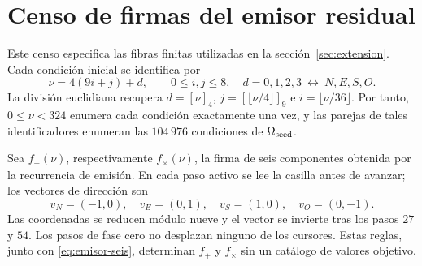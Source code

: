 \section{Censo de firmas del emisor residual}
\label{app:firmas-emision}

Este censo especifica las fibras finitas utilizadas en la sección~\ref{sec:extension}.
Cada condición inicial se identifica por
\[
 \nu=4(9i+j)+d,\qquad 0\leq i,j\leq8,\quad
 d=0,1,2,3\ \longleftrightarrow\ N,E,S,O.
\]
La división euclidiana recupera \(d=[\nu]_4\), \(j=[\lfloor\nu/4\rfloor]_9\)
e \(i=\lfloor\nu/36\rfloor\). Por tanto, \(0\leq\nu<324\) enumera
cada condición exactamente una vez, y las parejas de tales identificadores
enumeran las \(104\,976\) condiciones de \(\Omega_{\rm seed}\).

Sea \(f_+(\nu)\), respectivamente \(f_\times(\nu)\), la firma de seis
componentes obtenida por la recurrencia de emisión. En cada paso activo se lee
la casilla antes de avanzar; los vectores de dirección son
\[
 v_N=(-1,0),\quad v_E=(0,1),\quad v_S=(1,0),\quad v_O=(0,-1).
\]
Las coordenadas se reducen módulo nueve y el vector se invierte tras los
pasos \(27\) y \(54\). Los pasos de fase cero no desplazan ninguno de los
cursores. Estas reglas, junto con \eqref{eq:emisor-seis}, determinan
\(f_+\) y \(f_\times\) sin un catálogo de valores objetivo.

